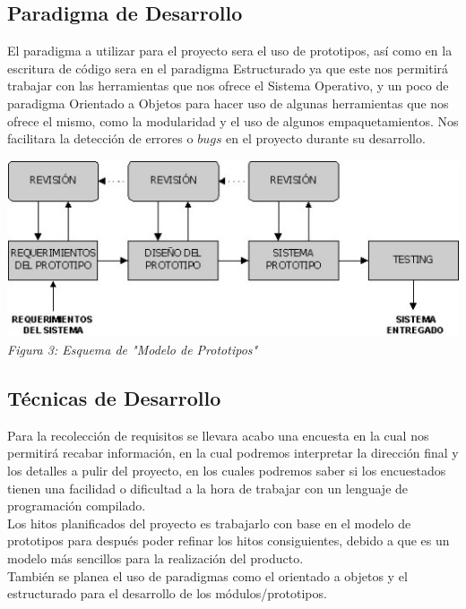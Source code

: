\documentclass[10pt,executivepaper]{article}
\begin{document}
\subsection{Paradigma de Desarrollo}
El paradigma a utilizar para el proyecto sera el uso de prototipos, así como en la escritura de código sera en el paradigma Estructurado ya que este nos permitirá trabajar con las herramientas que nos ofrece el Sistema Operativo, y un poco de paradigma Orientado a Objetos para hacer uso de algunas herramientas que nos ofrece el mismo, como la modularidad y el uso de algunos empaquetamientos. Nos facilitara la detección de errores o $bugs$ en el proyecto durante su desarrollo.
\begin{center}
  \includegraphics[scale=0.7]{imgs/esq_prototipo.jpg}
  \\\textit{Figura 3: Esquema de "Modelo de Prototipos" }
\end{center}
\subsection{Técnicas de Desarrollo}
Para la recolección de requisitos se llevara acabo una encuesta en la cual nos permitirá recabar información, en la cual podremos interpretar la dirección final y los detalles a pulir del proyecto, en los cuales podremos saber si los encuestados tienen una facilidad o dificultad a la hora de trabajar con un lenguaje de programación compilado.\\
Los hitos planificados del proyecto es trabajarlo con base en el modelo de prototipos para después poder refinar los hitos consiguientes, debido a que es un modelo más sencillos para la realización del producto.\\
También se planea el uso de paradigmas como el orientado a objetos y el estructurado para el desarrollo de los módulos/prototipos.
\end{document}
